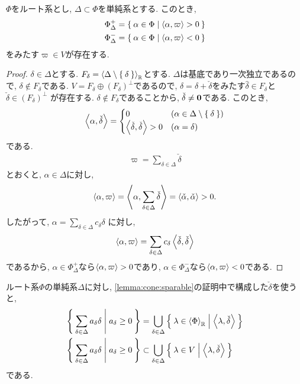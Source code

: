 \begin{prop}
  \label{lemma:cone:sparable}
  $\Phi$をルート系とし, $\Delta\subset\Phi$を単純系とする.
  このとき,
  \begin{align*}
    \Phi_{\Delta}^+&=\Set{\alpha\in\Phi | \Braket{\alpha,\varpi} > 0}\\
    \Phi_{\Delta}^-&=\Set{\alpha\in\Phi | \Braket{\alpha,\varpi} < 0}
  \end{align*}
  をみたす$\varpi\in V$が存在する.
\end{prop}
\begin{proof}
  $\delta\in\Delta$とする.
  $F_\delta=\Braket{\Delta\setminus\Set{\delta}}_{\mathbb{R}}$とする.
  $\Delta$は基底であり一次独立であるので,
  $\delta\not\in F_\delta$である.
  $V=F_\delta\oplus (F_\delta)^\perp$であるので,
  $\delta=\hat\delta+\check\delta$をみたす$\hat\delta\in F_\delta$と$\check\delta\in (F_\delta)^\perp$
  が存在する.
  $\delta\not\in F_\delta$であることから,
  $\check\delta \neq\boldsymbol{0}$である.
  このとき,
  \begin{align*}
    \Braket{\alpha,\check\delta}
    =
    \begin{cases}
      0 & (\alpha\in \Delta\setminus\Set{\delta})\\
      \Braket{\check\delta,\check\delta}>0 & (\alpha=\delta)
    \end{cases}
  \end{align*}
  である.
  \begin{align*}
    \varpi=\sum_{\delta\in\Delta}\check\delta
  \end{align*}
  とおくと, $\alpha\in\Delta$に対し,
  \begin{align*}
    \Braket{\alpha,\varpi}
    =\Braket{\alpha,\sum_{\delta\in\Delta}\check\delta}
    =\Braket{\check\alpha,\check\alpha}>0.
  \end{align*}
  したがって, $\alpha=\sum_{\delta\in \Delta}c_\delta \delta$
  に対し,
  \begin{align*}
    \Braket{\alpha,\varpi}=\sum_{\delta\in\Delta} c_\delta\Braket{\check\delta,\check\delta}
  \end{align*}
  であるから,
  $\alpha\in \Phi_\Delta^+$なら$\Braket{\alpha,\varpi}>0$であり,
  $\alpha\in \Phi_\Delta^-$なら$\Braket{\alpha,\varpi}<0$である.
\end{proof}
\begin{remark}
  ルート系$\Phi$の単純系$\Delta$に対し,
  \cref{lemma:cone:sparable}の証明中で構成した$\check\delta$を使うと,
  \begin{align*}
    \Set{\sum_{\delta\in\Delta}a_\delta \delta|a_\delta\geq 0}
    &= \bigcup_{\delta\in\Delta} \Set{\lambda\in \Braket{\Phi}_{\mathbb{R}}|\Braket{\lambda,\check\delta} }\\
    \Set{\sum_{\delta\in\Delta}a_\delta \delta|a_\delta\geq 0}
    &\subset\bigcup_{\delta\in\Delta} \Set{\lambda\in V |\Braket{\lambda,\check\delta} }
  \end{align*}
  である.
\end{remark}
